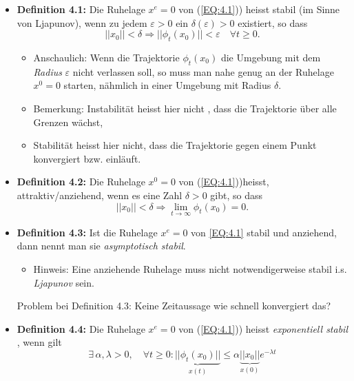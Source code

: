 \documentclass[ngerman]{tudscrreprt}
\begin{document}
\begin{itemize}
\item \textbf{Definition 4.1:} Die Ruhelage $x^e = 0$ von (\ref{EQ:4.1})) heisst stabil (im Sinne von Ljapunov), wenn zu jedem $\varepsilon > 0$ ein $\delta (\varepsilon) > 0$ existiert, so dass
\begin{equation*}
||x_0|| < \delta \Rightarrow ||\phi_t(x_0)||< \varepsilon \quad \forall t \ge 0.
\end{equation*}
\begin{figure}[H] 
  \centering 
  \def\svgwidth{350pt} 
   
\end{figure} 
\begin{itemize}
\item Anschaulich: Wenn die Trajektorie $\phi_t(x_0)$ die Umgebung mit dem \textit{Radius} $\varepsilon$ nicht verlassen soll, so muss man nahe genug an der Ruhelage $x^0 = 0 $ starten, nähmlich in einer Umgebung mit Radius $\delta$. 
\item Bemerkung: 
Instabilität heisst hier nicht , dass die Trajektorie über alle Grenzen wächst,
\item Stabilität heisst hier nicht, dass die Trajektorie gegen einem Punkt konvergiert bzw. einläuft.
\end{itemize}
\item \textbf{Definition 4.2:} Die Ruhelage $x^0 = 0$ von (\ref{EQ:4.1}))heisst, attraktiv/anziehend, wenn es eine Zahl $\delta > 0$ gibt, so dass
\begin{equation*}
||x_0|| < \delta \Rightarrow \lim \limits_{t\rightarrow \infty} \phi_t(x_0) = 0.
\end{equation*}
\item \textbf{Definition 4.3:} Ist die Ruhelage $x^e = 0$ von \ref{EQ:4.1} stabil und anziehend, dann nennt man sie \textit{asymptotisch stabil}.
\begin{itemize}
\item Hinweis: Eine anziehende Ruhelage muss nicht notwendigerweise stabil i.s. \textit{Ljapunov} sein.
\end{itemize}
\subitem Problem bei Definition 4.3: Keine Zeitaussage wie schnell konvergiert das?
\item \textbf{Definition 4.4: } Die Ruhelage $x^e = 0$ von (\ref{EQ:4.1})) heisst \textit{exponentiell stabil }, wenn gilt 
\begin{equation*}
\exists \, \alpha, \lambda > 0,\quad \forall t\ge 0: \underbrace{ || \phi_t(x_0) ||}_{x(t)} \le \alpha \underbrace{|| x_0 || }_{x(0)} e^{-\lambda t}

\end{equation*}
\end{itemize}
\end{document}
